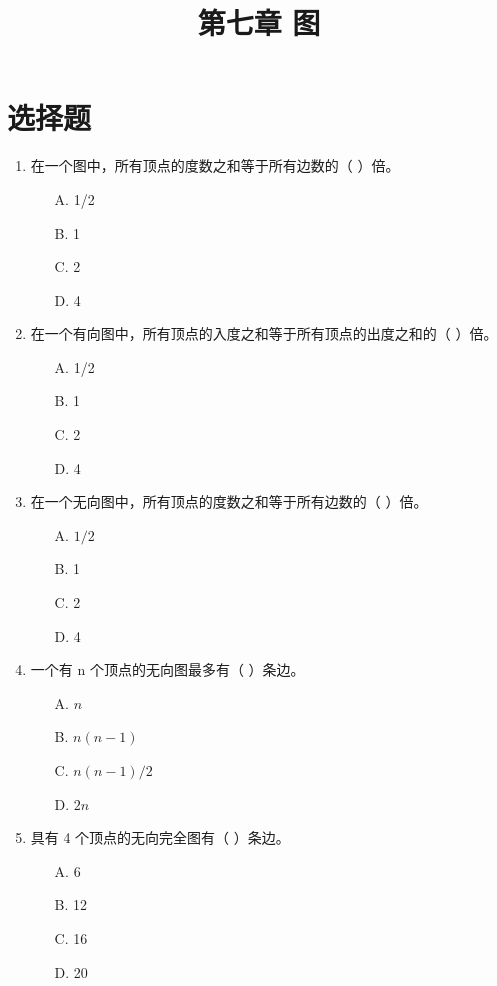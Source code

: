 \documentclass[12pt, a4paper]{article}
\title{\textbf{第七章 图}}
\author{}
\date{}
\begin{document}
\section*{选择题}

\begin{enumerate}[label=\arabic*.]
	\item 在一个图中，所有顶点的度数之和等于所有边数的（ ）倍。
	      \begin{enumerate}
		      \item[A.] 1/2
		      \item[B.] 1
		      \item[C.] 2
		      \item[D.] 4
	      \end{enumerate}

	\item 在一个有向图中，所有顶点的入度之和等于所有顶点的出度之和的（ ）倍。
	      \begin{enumerate}
		      \item[A.] 1/2
		      \item[B.] 1
		      \item[C.] 2
		      \item[D.] 4
	      \end{enumerate}

	\item 在一个无向图中，所有顶点的度数之和等于所有边数的（ ）倍。
	      \begin{enumerate}
		      \item[A.] $1/2$
		      \item[B.] 1
		      \item[C.] 2
		      \item[D.] 4
	      \end{enumerate}

	\item 一个有 n 个顶点的无向图最多有（ ）条边。
	      \begin{enumerate}
		      \item[A.] $n$
		      \item[B.] $n(n-1)$
		      \item[C.] $n(n-1)/2$
		      \item[D.] $2n$
	      \end{enumerate}

	\item 具有 4 个顶点的无向完全图有（ ）条边。
	      \begin{enumerate}
		      \item[A.] 6
		      \item[B.] 12
		      \item[C.] 16
		      \item[D.] 20
	      \end{enumerate}


\end{enumerate}
\end{document}
